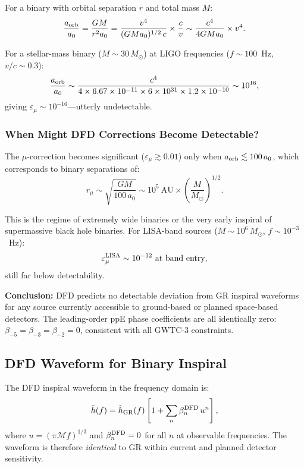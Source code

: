 \documentclass[aps,prd,twocolumn,superscriptaddress,nofootinbib]{revtex4-2}
\begin{document}
For a binary with orbital separation $r$ and total mass $M$:
\begin{equation}
\frac{a_{\rm orb}}{a_0} = \frac{GM}{r^2 a_0}
= \frac{v^4}{(GMa_0)^{1/2}\,c}\times\frac{c}{v}
\sim \frac{c^4}{4GMa_0}\times v^4.
\end{equation}

For a stellar-mass binary ($M \sim 30\,M_\odot$) at LIGO
frequencies ($f \sim 100$~Hz, $v/c \sim 0.3$):
\begin{equation}
\frac{a_{\rm orb}}{a_0} \sim \frac{c^4}{4\times6.67\times10^{-11}
\times 6\times10^{31}\times 1.2\times10^{-10}} \sim 10^{16},
\end{equation}
giving $\varepsilon_\mu \sim 10^{-16}$---utterly undetectable.

\subsubsection{When Might DFD Corrections Become Detectable?}

The $\mu$-correction becomes significant ($\varepsilon_\mu \gtrsim 0.01$)
only when $a_{\rm orb} \lesssim 100\,a_0$, which corresponds to
binary separations of:
\begin{equation}
r_\mu \sim \sqrt{\frac{GM}{100\,a_0}}
\sim 10^5~\text{AU}\times\left(\frac{M}{M_\odot}\right)^{1/2}.
\end{equation}

This is the regime of extremely wide binaries or the very early
inspiral of supermassive black hole binaries. For LISA-band sources
($M \sim 10^6\,M_\odot$, $f \sim 10^{-3}$~Hz):
\begin{equation}
\varepsilon_\mu^{\rm LISA} \sim 10^{-12}~\text{at band entry},
\end{equation}
still far below detectability.

\textbf{Conclusion:} DFD predicts no detectable deviation from
GR inspiral waveforms for any source currently accessible to
ground-based or planned space-based detectors. The leading-order
ppE phase coefficients are all identically zero:
$\beta_{-5} = \beta_{-3} = \beta_{-2} = 0$, consistent with all
GWTC-3 constraints.

\subsection{DFD Waveform for Binary Inspiral}

The DFD inspiral waveform in the frequency domain is:
\begin{equation}
\tilde{h}(f) = \tilde{h}_{\rm GR}(f)\left[1 +
\sum_{n} \beta_n^{\rm DFD}\,u^n\right],
\end{equation}
where $u = (\pi\mathcal{M} f)^{1/3}$ and
$\beta_n^{\rm DFD} = 0$ for all $n$ at observable frequencies.
The waveform is therefore \textit{identical} to GR within
current and planned detector sensitivity.
\end{document}
